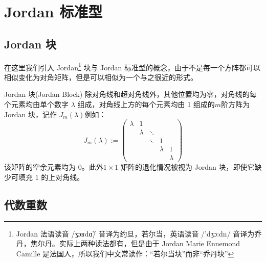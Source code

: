 \section{Jordan 标准型}




\subsection{Jordan 块}

在这里我们引入 Jordan\footnote{Jordan 法语读音 {\timesroman /ʒɔʁdɑ̃/} 音译为约旦，若尔当，英语读音 {\timesroman /'dʒɔ:dn/} 音译为乔丹，焦尔丹。实际上两种读法都有，但是由于 Jordan Marie Ennemond Camille 是法国人，所以我们中文常读作：``若尔当块''而非``乔丹块''} 块与 Jordan 标准型的概念，由于不是每一个方阵都可以相似变化为对角矩阵，但是可以相似为一个与之很近的形式。

\begin{definition}{Jordan 块(Jordan Block)}
	除对角线和超对角线外，其他位置均为零，对角线的每个元素均由单个数字 $\lambda$ 组成，对角线上方的每个元素均由 1 组成的$m$阶方阵为 Jordan 块，记作 $J_m(\lambda)$例如：
	$$
	J_m(\lambda):=\begin{pmatrix}
	\lambda & 1 &  &  & \\
	& \lambda & \ddots &  & \\
	&  & \ddots & 1 & \\
	&  &  & \lambda & 1\\
	&  &  &  &\lambda 
	\end{pmatrix}
	$$
	该矩阵的空余元素均为 0。此外$1\times 1$ 矩阵的退化情况被视为 Jordan 块，即使它缺少可填充 1 的上对角线。
\end{definition}

\subsection{代数重数}


